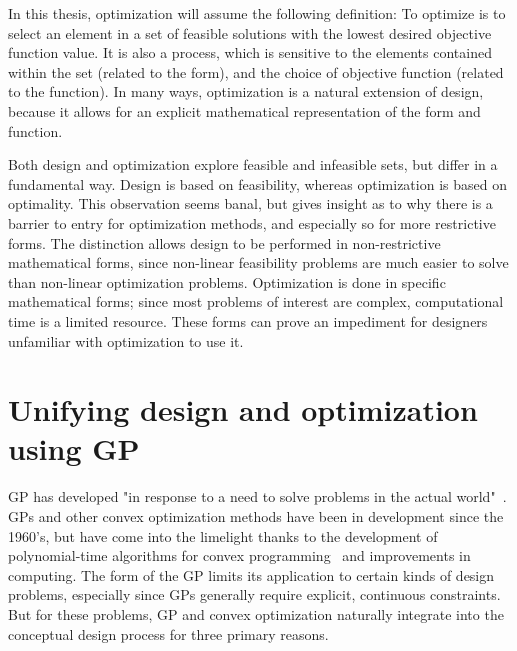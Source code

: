 In this thesis, optimization will assume the following definition: To optimize is to select an
element in a set of feasible solutions with the lowest desired objective
function value. It is also a process, which is sensitive to the elements contained within the set
(related to the form), and the choice of objective function (related to the
function).
In many ways, optimization is a natural extension of design, because it allows
for an explicit mathematical representation of the form and function.

Both design and
optimization explore feasible and infeasible sets, but differ in a fundamental way.
Design is based on feasibility, whereas optimization is based on optimality.
This observation seems banal, but gives insight as to why there is a barrier
to entry for optimization methods, and especially so for more restrictive forms.
The distinction allows design to be performed
in non-restrictive mathematical forms, since non-linear feasibility problems are
much easier to solve than non-linear optimization problems. Optimization is
done in specific mathematical forms; since most problems of interest are complex,
computational time is a limited resource. These forms can prove
an impediment for designers unfamiliar with optimization to use it.

\section{Unifying design and optimization using GP}

\gls{GP} has developed "in response to a need to solve problems in the actual
world"~\cite{duffingp}. \gls{GP}s and other convex optimization methods have been
in development since the 1960's, but have come into the limelight thanks to the development of
polynomial-time algorithms for convex programming~\cite{interior_point} and
improvements in computing. The form of the \gls{GP} limits its application
to certain kinds of design
problems, especially since \gls{GP}s generally require explicit, continuous constraints.
But for these problems, \gls{GP} and convex
optimization naturally integrate into the conceptual design process
for three primary reasons.

